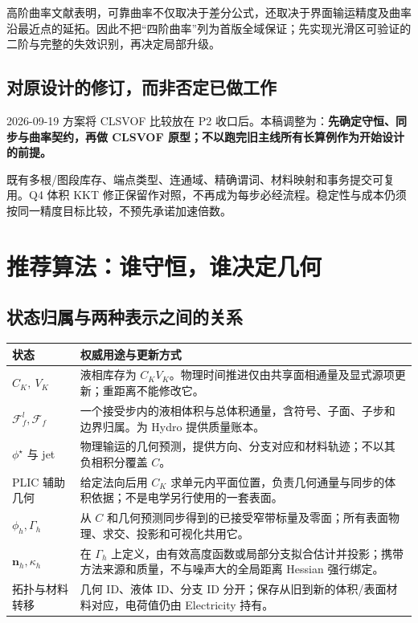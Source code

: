 \documentclass[11pt,a4paper]{article}
\newcommand{\vct}[1]{\boldsymbol{#1}}
\begin{document}
高阶曲率文献表明，可靠曲率不仅取决于差分公式，还取决于界面输运精度及曲率沿最近点的延拓\cite{coquerelle2016}。因此不把“四阶曲率”列为首版全域保证；先实现光滑区可验证的二阶与完整的失效识别，再决定局部升级。

\subsection{对原设计的修订，而非否定已做工作}
2026-09-19 方案将 CLSVOF 比较放在 P2 收口后。本稿调整为：\textbf{先确定守恒、同步与曲率契约，再做 CLSVOF 原型；不以跑完旧主线所有长算例作为开始设计的前提。}

既有多根/图段库存、端点类型、连通域、精确谓词、材料映射和事务提交可复用。Q4 体积 KKT 修正保留作对照，不再成为每步必经流程。稳定性与成本仍须按同一精度目标比较，不预先承诺加速倍数。

\clearpage
\section{推荐算法：谁守恒，谁决定几何}
\subsection{状态归属与两种表示之间的关系}
\begin{longtable}{L{34mm}L{115mm}}
\toprule 状态 & 权威用途与更新方式\\\midrule\endhead
$C_K,\ V_K$ & 液相库存为 $C_KV_K$。物理时间推进仅由共享面相通量及显式源项更新；重距离不能修改它。\\
$\mathcal F_f^l,\mathcal F_f$ & 一个接受步内的液相体积与总体积通量，含符号、子面、子步和边界归属。为 Hydro 提供质量账本。\\
$\phi^\star$ 与 jet & 物理输运的几何预测，提供方向、分支对应和材料轨迹；不以其负相积分覆盖 $C$。\\
PLIC 辅助几何 & 给定法向后用 $C_K$ 求单元内平面位置，负责几何通量与同步的体积依据；不是电学另行使用的一套表面。\\
$\phi_h,\Gamma_h$ & 从 $C$ 和几何预测同步得到的已接受窄带标量及零面；所有表面物理、求交、投影和可视化共用它。\\
$\vct n_h,\kappa_h$ & 在 $\Gamma_h$ 上定义，由有效高度函数或局部分支拟合估计并投影；携带方法来源和质量，不与噪声大的全局距离 Hessian 强行绑定。\\
拓扑与材料转移 & 几何 ID、液体 ID、分支 ID 分开；保存从旧到新的体积/表面材料对应，电荷值仍由 Electricity 持有。\\\bottomrule
\end{longtable}
\end{document}
